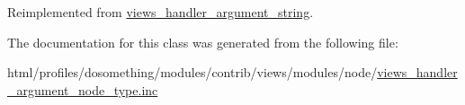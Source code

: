 Reimplemented from \hyperlink{classviews__handler__argument__string_abd176c527d765826b51c50346309b545}{views\_\-handler\_\-argument\_\-string}.

The documentation for this class was generated from the following file:\begin{DoxyCompactItemize}
\item 
html/profiles/dosomething/modules/contrib/views/modules/node/\hyperlink{views__handler__argument__node__type_8inc}{views\_\-handler\_\-argument\_\-node\_\-type.inc}\end{DoxyCompactItemize}
